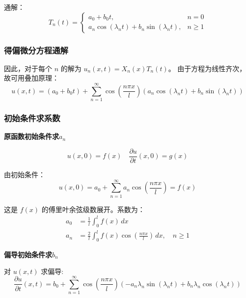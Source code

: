 \documentclass[a4paper, 12pt, oneside]{article} %
\numberwithin{subsection}{section}
\numberwithin{subsubsection}{subsection}
\theoremstyle{plain}
\theoremstyle{definition}
\theoremstyle{remark}
\begin{document}
		通解：
		\begin{equation}
			T_n(t) = 
			\begin{cases}
				a_0 + b_0 t, & n=0 \\
				a_n \cos(\lambda_n t) + b_n \sin(\lambda_n t), & n \ge 1
			\end{cases}
		\end{equation}
		
		\subsubsection{得偏微分方程通解}
		因此，对于每个 $n$ 的解为 $u_n(x,t) = X_n(x) T_n(t)$。
		由于方程为线性齐次，故可用叠加原理：
		\begin{equation}
			u(x, t) = (a_0 + b_0 t) + \sum_{n=1}^{\infty} \cos\left(\frac{n\pi x}{l}\right) \left( a_n \cos(\lambda_n t) + b_n \sin(\lambda_n t) \right)
		\end{equation}
		
		\subsubsection{初始条件求系数}
		\noindent
		\textbf{原函数初始条件求$a_n$}
		
		\begin{equation}
			u(x, 0) = f(x) \quad \frac{\partial u}{\partial t}(x, 0) = g(x)
		\end{equation}
		
		由初始条件：
		\begin{equation}
			u(x, 0) = a_0 + \sum_{n=1}^{\infty} a_n \cos\left(\frac{n\pi x}{l}\right) = f(x)
		\end{equation}
		
		这是 $f(x)$ 的傅里叶余弦级数展开。系数为：
		\begin{align}
			a_0 &= \frac{1}{l} \int_0^l f(x) \, dx \\
			a_n &= \frac{2}{l} \int_0^l f(x) \cos\left(\frac{n\pi x}{l}\right) \, dx, \quad n \ge 1
		\end{align}
		
		\noindent
		\textbf{偏导初始条件求$b_n$}
		
		对 $u(x,t)$ 求偏导:
		\begin{equation}
			\frac{\partial u}{\partial t}(x, t) = b_0 + \sum_{n=1}^{\infty} \cos\left(\frac{n\pi x}{l}\right) \left( -a_n \lambda_n \sin(\lambda_n t) + b_n \lambda_n \cos(\lambda_n t) \right)
		\end{equation}
		
\end{document}
